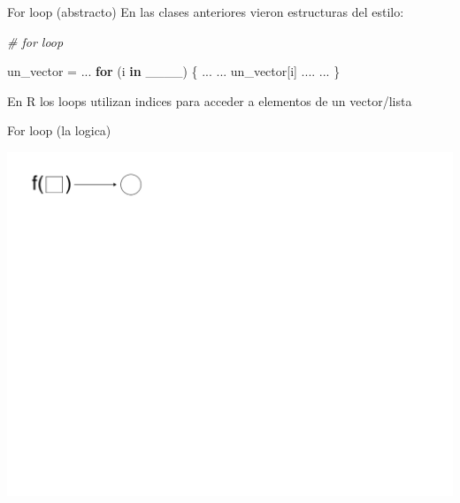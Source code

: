 \documentclass[
  10pt,
  ignorenonframetext,
]{beamer}
\newenvironment{Shaded}{\begin{snugshade}}{\end{snugshade}}
\newcommand{\CommentTok}[1]{\textcolor[rgb]{0.56,0.35,0.01}{\textit{#1}}}
\newcommand{\ControlFlowTok}[1]{\textcolor[rgb]{0.13,0.29,0.53}{\textbf{#1}}}
\newcommand{\NormalTok}[1]{#1}
\newcommand{\OtherTok}[1]{\textcolor[rgb]{0.56,0.35,0.01}{#1}}
\begin{document}
\begin{frame}[fragile]{For loop (abstracto)}
\protect\hypertarget{for-loop-abstracto}{}
En las clases anteriores vieron estructuras del estilo: \vspace{15pt}

\begin{Shaded}
\begin{Highlighting}[]
\CommentTok{\# for loop}

\NormalTok{un\_vector }\OtherTok{=}\NormalTok{ ...}
\ControlFlowTok{for}\NormalTok{ (i }\ControlFlowTok{in}\NormalTok{ \_\_\_\_) \{}
\NormalTok{  ...}
\NormalTok{  ... un\_vector[i] ....}
\NormalTok{  ...}
\NormalTok{\}}
\end{Highlighting}
\end{Shaded}

\vspace{15pt}

En R los loops utilizan indices para acceder a elementos de un
vector/lista
\end{frame}

\begin{frame}{For loop (la logica)}
\protect\hypertarget{for-loop-la-logica}{}
\begin{center}\includegraphics[width=0.9\linewidth]{images/explicando_forloops_en_r_0a} \end{center}
\end{frame}
\end{document}

